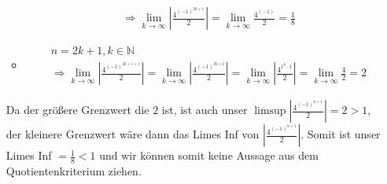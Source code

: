 \documentclass{scrartcl}
\begin{document}
\begin{enumerate}[(i)]
\begin{itemize}
\begin{align*}
								&\Rightarrow \lim_{k \to \infty}\left|\frac{4^{(-1)^{2k+1}}}{2}\right| = \lim_{k \to \infty}\frac{4^{(-1)}}{2}= \frac{1}{8}
							\end{align*}
					\item	\begin{align*}
								&n = 2k + 1, k \in \mathbb{N} \\
								&\Rightarrow \lim_{k \to \infty}\left|\frac{4^{(-1)^{2k+1+1}}}{2}\right| = \lim_{k \to \infty}\left|\frac{4^{(-1)^{2k+2}}}{2}\right| = \lim_{k \to \infty}\left|\frac{4^{1^k\cdot 1}}{2}\right| = \lim_{k \to \infty}\frac{4}{2} = 2
							\end{align*}
				\end{itemize}
				Da der größere Grenzwert die $2$ ist, ist auch unser $\limsup\left|\frac{4^{(-1)^{n+1}}}{2}\right| = 2 > 1$, der kleinere Grenzwert wäre dann das Limes Inf von $\left|\frac{4^{(-1)^{n+1}}}{2}\right|$. Somit ist unser Limes Inf $= \frac{1}{8} < 1$ und wir können somit keine Aussage aus dem Quotientenkriterium ziehen.
	\end{enumerate}
\end{document}
